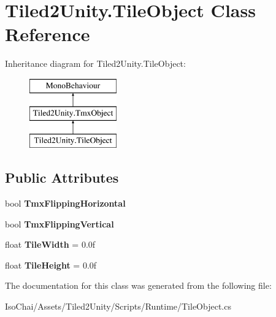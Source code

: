 \hypertarget{class_tiled2_unity_1_1_tile_object}{}\section{Tiled2\+Unity.\+Tile\+Object Class Reference}
\label{class_tiled2_unity_1_1_tile_object}
Inheritance diagram for Tiled2\+Unity.\+Tile\+Object\+:\begin{figure}[H]
\begin{center}
\leavevmode
\includegraphics[height=3.000000cm]{class_tiled2_unity_1_1_tile_object}
\end{center}
\end{figure}
\subsection*{Public Attributes}
\begin{DoxyCompactItemize}
\item 
\mbox{\label{class_tiled2_unity_1_1_tile_object_abafd4afef3f59c65ca1bc370ce1af9f7}} 
bool {\bfseries Tmx\+Flipping\+Horizontal}
\item 
\mbox{\label{class_tiled2_unity_1_1_tile_object_a90fdfe12d49c2e7bc900d3ad73a5f0da}} 
bool {\bfseries Tmx\+Flipping\+Vertical}
\item 
\mbox{\label{class_tiled2_unity_1_1_tile_object_af124dfbce4dee89e7d41ab53fc7a3a23}} 
float {\bfseries Tile\+Width} = 0.\+0f
\item 
\mbox{\label{class_tiled2_unity_1_1_tile_object_a03f3f899c6efc1fa8f79f377fcfa12bd}} 
float {\bfseries Tile\+Height} = 0.\+0f
\end{DoxyCompactItemize}


The documentation for this class was generated from the following file\+:\begin{DoxyCompactItemize}
\item 
Iso\+Chai/\+Assets/\+Tiled2\+Unity/\+Scripts/\+Runtime/Tile\+Object.\+cs\end{DoxyCompactItemize}
